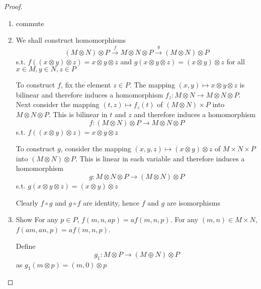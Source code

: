\documentclass[11pt]{article}
\begin{document}
\begin{proof}
\begin{enumerate}
\item commute
\begin{center}\end{center}

\item We shall construct homomorphisms
\begin{equation*}
(M\otimes N)\otimes P\xrightarrow{f}M\otimes N\otimes P\xrightarrow{g}(M\otimes N)\otimes P
\end{equation*}
s.t. \(f((x\otimes y)\otimes z)=x\otimes y\otimes z\) and \(g(x\otimes y\otimes z)=(x\otimes y)\otimes z\) for all \(x\in M,y\in N,z\in P\)

To construct \(f\), fix the element \(z\in P\). The mapping \((x,y)\mapsto x\otimes y\otimes z\) is bilinear and
therefore induces a homomorphism \(f_z:M\otimes N\to M\otimes N\otimes P\). Next consider the
mapping \((t,z)\mapsto f_z(t)\) of \((M\otimes N)\times P\) into \(M\otimes N\otimes P\). This is bilinear in \(t\)
and \(z\) and therefore induces a homomorphism
\begin{equation*}
f:(M\otimes N)\otimes P\to M\otimes N\otimes P
\end{equation*}
s.t. \(f((x\otimes y)\otimes z)=x\otimes y\otimes z\)

To construct \(g\), consider the mapping \((x,y,z)\mapsto(x\otimes y)\otimes z\) of \(M\times N\times P\)
into \((M\otimes N)\otimes P\). This is linear in each variable and therefore induces a homomorphism
\begin{equation*}
g:M\otimes N\otimes P\to(M\otimes N)\otimes P
\end{equation*}
s.t. \(g(x\otimes y\otimes z)=(x\otimes y)\otimes z\)

Clearly \(f\circ g\) and \(g\circ f\) are identity, hence \(f\) and \(g\) are isomorphisms

\item Show For any \(p\in P\), \(f(m,n,ap)=af(m,n,p)\). For
any \((m,n)\in M\times N\), \(f(am,an,p)=af(m,n,p)\).

Define
\begin{equation*}
g_1:M\otimes P\to(M\oplus N)\otimes P
\end{equation*}
as \(g_1(m\otimes p)=(m,0)\otimes p\)
\end{enumerate}
\end{proof}
\end{document}

